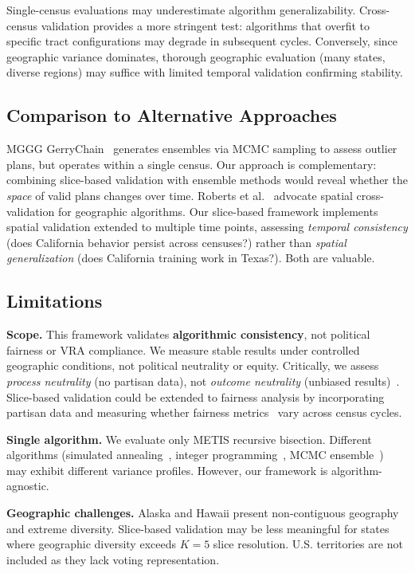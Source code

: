 Single-census evaluations may underestimate algorithm generalizability. Cross-census validation provides a more stringent test: algorithms that overfit to specific tract configurations may degrade in subsequent cycles. Conversely, since geographic variance dominates, thorough geographic evaluation (many states, diverse regions) may suffice with limited temporal validation confirming stability.

\subsection{Comparison to Alternative Approaches}

MGGG GerryChain~\cite{gerrychain2018} generates ensembles via MCMC sampling to assess outlier plans, but operates within a single census. Our approach is complementary: combining slice-based validation with ensemble methods would reveal whether the \textit{space} of valid plans changes over time. Roberts et al.~\cite{roberts2017} advocate spatial cross-validation for geographic algorithms. Our slice-based framework implements spatial validation extended to multiple time points, assessing \textit{temporal consistency} (does California behavior persist across censuses?) rather than \textit{spatial generalization} (does California training work in Texas?). Both are valuable.

\subsection{Limitations}

\textbf{Scope.} This framework validates \textbf{algorithmic consistency}, not political fairness or VRA compliance. We measure stable results under controlled geographic conditions, not political neutrality or equity. Critically, we assess \textit{process neutrality} (no partisan data), not \textit{outcome neutrality} (unbiased results)~\cite{rodden2019}. Slice-based validation could be extended to fairness analysis by incorporating partisan data and measuring whether fairness metrics~\cite{stephanopoulos2015, grofman1983} vary across census cycles.

\textbf{Single algorithm.} We evaluate only METIS recursive bisection. Different algorithms (simulated annealing~\cite{altman1998}, integer programming~\cite{mehrotra1998}, MCMC ensemble~\cite{gerrychain2018}) may exhibit different variance profiles. However, our framework is algorithm-agnostic.

\textbf{Geographic challenges.} Alaska and Hawaii present non-contiguous geography and extreme diversity. Slice-based validation may be less meaningful for states where geographic diversity exceeds $K=5$ slice resolution. U.S. territories are not included as they lack voting representation.

